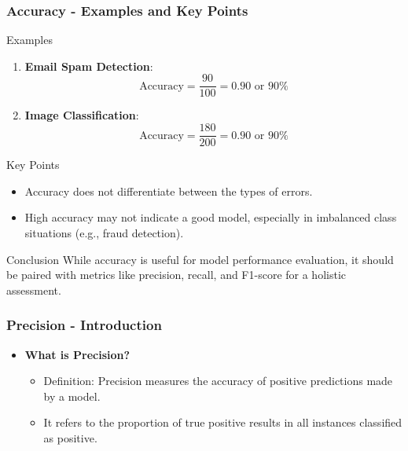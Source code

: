\documentclass[aspectratio=169]{beamer}
\begin{document}
\begin{frame}[fragile]
    \frametitle{Accuracy - Examples and Key Points}
    \begin{block}{Examples}
        \begin{enumerate}
            \item \textbf{Email Spam Detection}: 
            \[
            \text{Accuracy} = \frac{90}{100} = 0.90 \text{ or 90\%}
            \]
            \item \textbf{Image Classification}: 
            \[
            \text{Accuracy} = \frac{180}{200} = 0.90 \text{ or 90\%}
            \]
        \end{enumerate}
    \end{block}

    \begin{block}{Key Points}
        \begin{itemize}
            \item Accuracy does not differentiate between the types of errors.
            \item High accuracy may not indicate a good model, especially in imbalanced class situations (e.g., fraud detection).
        \end{itemize}
    \end{block}
    
    \begin{block}{Conclusion}
        While accuracy is useful for model performance evaluation, it should be paired with metrics like precision, recall, and F1-score for a holistic assessment.
    \end{block}
\end{frame}

\begin{frame}[fragile]
    \frametitle{Precision - Introduction}
    \begin{itemize}
        \item \textbf{What is Precision?}
        \begin{itemize}
            \item Definition: Precision measures the accuracy of positive predictions made by a model.
            \item It refers to the proportion of true positive results in all instances classified as positive.
        \end{itemize}
    \end{itemize}
\end{frame}
\end{document}
